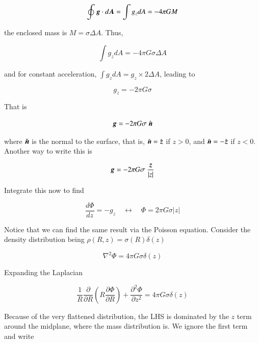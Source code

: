 \begin{equation}
\oint {\boldsymbol{g}} \cdot d{\boldsymbol{A}} = \int g_z dA =  -4\pi G M 
\end{equation}

the enclosed mass is $M = \sigma \Delta A$. Thus, 

\begin{equation}
\int g_z dA  = -4\pi G \sigma \Delta A  
\end{equation}

and for constant acceleration, $\int g_z dA = g_z \times 2 \Delta A $, leading to 

\begin{equation}
g_z  = -2\pi G \sigma  
\end{equation}

That is 

\begin{equation}
\v{g}  = -2\pi G \sigma \ \hat{\v{n}}
\end{equation}

where $\hat{{\boldsymbol{n}}}$ is the normal to the surface, that is, $\hat{{\boldsymbol{n}}} = \hat{{\boldsymbol{z}}}$ if $z>0$, and $\hat{{\boldsymbol{n}}} = -\hat{{\boldsymbol{z}}}$ if $z<0$.  Another way to write this is 

\begin{equation}
\v{g}  = -2\pi G \sigma \ \frac{\v{z}}{|z|}
\end{equation}

Integrate this now to find 

\begin{equation}
\frac{d\varPhi}{dz}  = -g_z \quad \longleftrightarrow \quad\varPhi = 2\pi G \sigma |z|
\end{equation}


Notice that we can find the same result via the Poisson equation. Consider the density distribution being $\rho(R,z) = \sigma(R) \delta(z)$

\begin{equation}
\nabla^2 \varPhi  = 4\pi G \sigma \delta(z)
\end{equation}

Expanding the Laplacian 

\begin{equation}
\frac{1}{R}\frac{\partial}{\partial R} \left(R \frac{\partial\varPhi}{\partial R}\right) +  \frac{\partial^2\varPhi}{\partial z^2}  = 4\pi G \sigma \delta(z)
\end{equation}


Because of the very flattened distribution, the LHS is dominated by the $z$ term around the midplane, where the mass distribution is. We ignore the first term and write 

